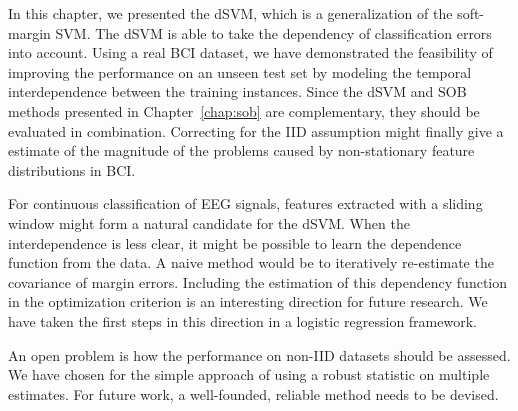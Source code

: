 In this chapter, we presented the \ac{dSVM}, which is a generalization of the
soft-margin \ac{SVM}. The \ac{dSVM} is able to take the dependency of
classification errors into account. Using a real \ac{BCI} dataset, we have
demonstrated the feasibility of improving the performance on an unseen test set
by modeling the temporal interdependence between the training instances.
%
Since the \ac{dSVM} and \ac{SOB} methods presented in Chapter~\ref{chap:sob} are
complementary, they should be evaluated in combination. Correcting for the
\ac{IID} assumption might finally give a estimate of the magnitude of the
problems caused by non-stationary feature distributions in \ac{BCI}.

For continuous classification of \ac{EEG} signals, features extracted with a
sliding window might form a natural candidate for the \ac{dSVM}. 
When the interdependence is less clear, it might be possible to learn the
dependence function from the data. A naive method would be to iteratively
re-estimate the covariance of margin errors. Including the estimation of this
dependency function in the optimization criterion is an interesting direction
for future research. We have taken the first steps in this direction in a logistic regression framework.

An open problem is how the performance on non-\ac{IID} datasets should be
assessed. We have chosen for the simple approach of using a robust statistic on
multiple estimates. For future work, a well-founded, reliable method needs to be devised.
